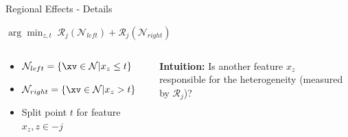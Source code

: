 \documentclass[11pt,compress,t,notes=noshow, aspectratio=169, xcolor=table,dvipsnames]{beamer}
\begin{document}
\begin{frame}{Regional Effects - Details}
\begin{itemize}
\medskip

\centerline{$\arg \min_{z, t} \; \mathcal{R}_j\left(\mathcal{N}_{left}\right) + \mathcal{R}_j\left(\mathcal{N}_{right}\right)$}
\end{itemize}

      \begin{columns}[c, totalwidth=\textwidth]
        \begin{column}{0.57\textwidth}
    \begin{itemize}
        \item $\mathcal{N}_{left} = \{\xv \in \mathcal{N}|x_z \leq t\}$
        \item $\mathcal{N}_{right} = \{\xv \in \mathcal{N}|x_z > t\}$
        \item Split point $t$ for feature $x_z, z \in -j$
    \end{itemize}
        \end{column}
          \begin{column}{0.43\textwidth}
          \centering
          \textbf{Intuition:} Is another feature $x_z$ \\responsible for the heterogeneity (measured by $\mathcal{R}_j$)?
        \end{column}
    \end{columns}
\end{frame}
\end{document}
